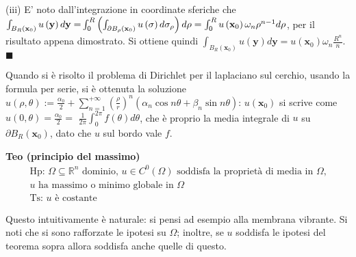 \documentclass{article}
\begin{document}
(iii) E' noto dall'integrazione in coordinate sferiche che $%
\int_{B_{R}\left( \mathbf{x}_{0}\right) }u\left( \mathbf{y}\right) d\mathbf{%
y=}\int_{0}^{R}\left( \int_{\partial B_{\rho }\left( \mathbf{x}_{0}\right)
}u\left( \sigma \right) d\sigma _{\rho }\right) d\rho =\int_{0}^{R}u\left( 
\mathbf{x}_{0}\right) \omega _{n}\rho ^{n-1}d\rho $, per il risultato appena
dimostrato. Si ottiene quindi $\int_{B_{R}\left( \mathbf{x}_{0}\right)
}u\left( \mathbf{y}\right) d\mathbf{y}=u\left( \mathbf{x}_{0}\right) \omega
_{n}\frac{R^{n}}{n}$. $\blacksquare $

Quando si \`{e} risolto il problema di Dirichlet per il laplaciano sul
cerchio, usando la formula per serie, si \`{e} ottenuta la soluzione $%
u\left( \rho ,\theta \right) :=\frac{\alpha _{0}}{2}+\sum_{n=1}^{+\infty
}\left( \frac{\rho }{r}\right) ^{n}\left( \alpha _{n}\cos n\theta +\beta
_{n}\sin n\theta \right) $: $u\left( \mathbf{x}_{0}\right) $ si scrive come $%
u\left( 0,\theta \right) =\frac{\alpha _{0}}{2}=$ $\frac{1}{2\pi }%
\int_{0}^{2\pi }f\left( \theta \right) d\theta $, che \`{e} proprio la media
integrale di $u$ su $\partial B_{R}\left( \mathbf{x}_{0}\right) $, dato che $%
u$ sul bordo vale $f$.

\textbf{Teo (principio del massimo)}%
\begin{gather*}
\text{Hp: }\Omega \subseteq 
\mathbb{R}
^{n}\text{ dominio, }u\in C^{0}\left( \Omega \right) \text{ soddisfa la
propriet\`{a} di media in }\Omega \text{,} \\
u\text{ ha massimo o minimo globale in }\Omega \\
\text{Ts: }u\text{ \`{e} costante}
\end{gather*}

Questo intuitivamente \`{e} naturale: si pensi ad esempio alla membrana
vibrante. Si noti che si sono rafforzate le ipotesi su $\Omega $; inoltre,
se $u$ soddisfa le ipotesi del teorema sopra allora soddisfa anche quelle di
questo.
\end{document}
